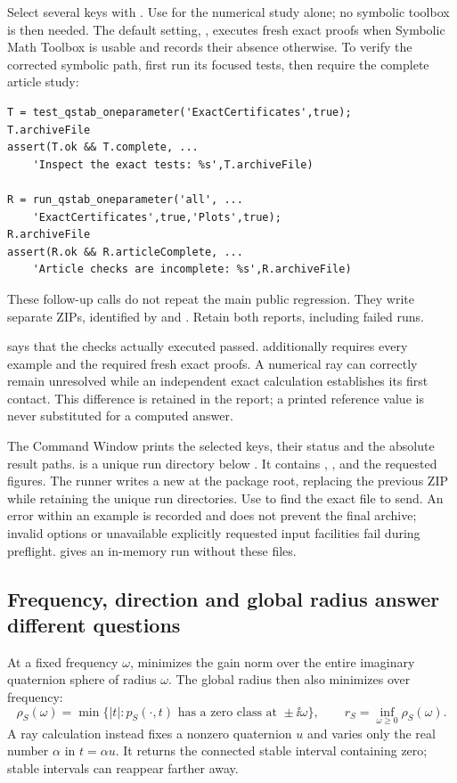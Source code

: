 Select several keys with . Use
 for the numerical study alone; no symbolic
toolbox is then needed. The default setting, , executes fresh exact
proofs when Symbolic Math Toolbox is usable and records their absence
otherwise. To verify the corrected symbolic path, first run its
focused tests, then require the complete article study:
\begin{lstlisting}
T = test_qstab_oneparameter('ExactCertificates',true);
T.archiveFile
assert(T.ok && T.complete, ...
    'Inspect the exact tests: %s',T.archiveFile)

R = run_qstab_oneparameter('all', ...
    'ExactCertificates',true,'Plots',true);
R.archiveFile
assert(R.ok && R.articleComplete, ...
    'Article checks are incomplete: %s',R.archiveFile)
\end{lstlisting}
These follow-up calls do not repeat the main public regression. They write
separate ZIPs, identified by  and .
Retain both reports, including failed runs.

 says that the checks actually executed passed.
 additionally requires every example and the required
fresh exact proofs. A numerical ray can correctly remain unresolved while
an independent exact calculation establishes its first contact. This
difference is retained in the report; a printed reference value is never
substituted for a computed answer.

The Command Window prints the selected keys, their status and the absolute
result paths.  is a unique run directory below
. It contains , ,
 and the requested figures. The runner writes a new
 at the package root, replacing the
previous ZIP while retaining the unique run directories. Use
 to find the exact file to send. An error within an example
is recorded and does not prevent the final archive; invalid options or
unavailable explicitly requested input facilities fail during preflight.
 gives an in-memory run without these files.

\subsection{Frequency, direction and global radius answer different questions}
At a fixed frequency $\omega$,  minimizes the gain norm over
the entire imaginary quaternion sphere of radius $\omega$. The global
radius then also minimizes over frequency:
\[
 \rho_S(\omega)=\min\{|t|:p_S(\cdot,t)
     \text{ has a zero class at }\pm\ii\omega\},
 \qquad r_S=\inf_{\omega\ge0}\rho_S(\omega).
\]
A ray calculation instead fixes a nonzero quaternion $u$ and varies only
the real number $\alpha$ in $t=\alpha u$. It returns the connected stable
interval containing zero; stable intervals can reappear farther away.

